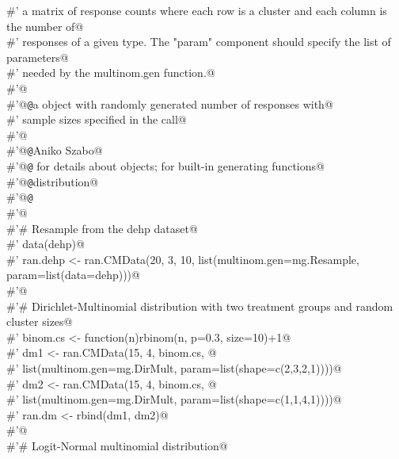 \documentclass[reqno]{amsart}
\begin{document}
\begin{flushleft}
\begin{list}{}{}
\mbox{}\verb@#' a matrix of response counts where each row is a cluster and each column is the number of@\\
\mbox{}\verb@#' responses of a given type. The "param" component should specify the list of parameters@\\
\mbox{}\verb@#' needed by the multinom.gen function.@\\
\mbox{}\verb@#'@\\
\mbox{}\verb@#'@{\tt @}\verb@return a  object with randomly generated number of responses with@\\
\mbox{}\verb@#' sample sizes specified in the call@\\
\mbox{}\verb@#'@\\
\mbox{}\verb@#'@{\tt @}\verb@author Aniko Szabo@\\
\mbox{}\verb@#'@{\tt @}\verb@seealso {} for details about  objects;  for built-in generating functions@\\
\mbox{}\verb@#'@{\tt @}\verb@keywords distribution@\\
\mbox{}\verb@#'@{\tt @}\verb@examples@\\
\mbox{}\verb@#'@\\
\mbox{}\verb@#'# Resample from the dehp dataset@\\
\mbox{}\verb@#' data(dehp)@\\
\mbox{}\verb@#' ran.dehp <- ran.CMData(20, 3, 10, list(multinom.gen=mg.Resample, param=list(data=dehp)))@\\
\mbox{}\verb@#'@\\
\mbox{}\verb@#'# Dirichlet-Multinomial distribution with two treatment groups and random cluster sizes@\\
\mbox{}\verb@#' binom.cs <- function(n){rbinom(n, p=0.3, size=10)+1}@\\
\mbox{}\verb@#' dm1 <- ran.CMData(15, 4, binom.cs, @\\
\mbox{}\verb@#'                   list(multinom.gen=mg.DirMult, param=list(shape=c(2,3,2,1))))@\\
\mbox{}\verb@#' dm2 <- ran.CMData(15, 4, binom.cs, @\\
\mbox{}\verb@#'                   list(multinom.gen=mg.DirMult, param=list(shape=c(1,1,4,1))))@\\
\mbox{}\verb@#' ran.dm <- rbind(dm1, dm2)@\\
\mbox{}\verb@#'@\\
\mbox{}\verb@#'# Logit-Normal multinomial distribution@\\

\end{list}
\end{flushleft}
\end{document}

